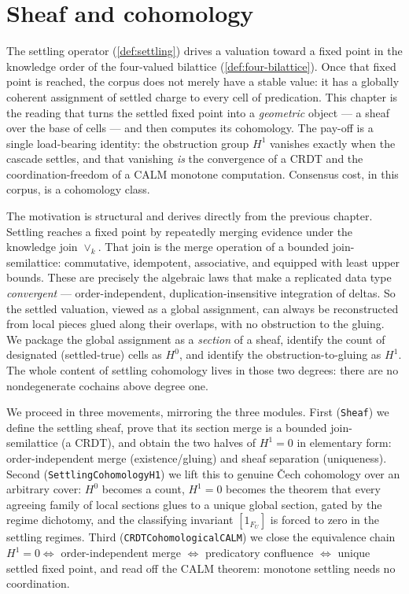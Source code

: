 \chapter{Sheaf and cohomology}\label{ch:sheaf}

The settling operator (\cref{def:settling}) drives a valuation toward a fixed point in the knowledge order of the four-valued bilattice (\cref{def:four-bilattice}). Once that fixed point is reached, the corpus does not merely have a stable value: it has a globally coherent assignment of settled charge to every cell of predication. This chapter is the reading that turns the settled fixed point into a \emph{geometric} object --- a sheaf over the base of cells --- and then computes its cohomology. The pay-off is a single load-bearing identity: the obstruction group $H^1$ vanishes exactly when the cascade settles, and that vanishing \emph{is} the convergence of a CRDT and the coordination-freedom of a CALM monotone computation. Consensus cost, in this corpus, is a cohomology class.

The motivation is structural and derives directly from the previous chapter. Settling reaches a fixed point by repeatedly merging evidence under the knowledge join $\vee_k$. That join is the merge operation of a bounded join-semilattice: commutative, idempotent, associative, and equipped with least upper bounds. These are precisely the algebraic laws that make a replicated data type \emph{convergent} --- order-independent, duplication-insensitive integration of deltas. So the settled valuation, viewed as a global assignment, can always be reconstructed from local pieces glued along their overlaps, with no obstruction to the gluing. We package the global assignment as a \emph{section} of a sheaf, identify the count of designated (settled-true) cells as $H^0$, and identify the obstruction-to-gluing as $H^1$. The whole content of settling cohomology lives in those two degrees: there are no nondegenerate cochains above degree one.

We proceed in three movements, mirroring the three modules. First (\texttt{Sheaf}) we define the settling sheaf, prove that its section merge is a bounded join-semilattice (a CRDT), and obtain the two halves of $H^1 = 0$ in elementary form: order-independent merge (existence/gluing) and sheaf separation (uniqueness). Second (\texttt{SettlingCohomologyH1}) we lift this to genuine \v{C}ech cohomology over an arbitrary cover: $H^0$ becomes a count, $H^1 = 0$ becomes the theorem that every agreeing family of local sections glues to a unique global section, gated by the regime dichotomy, and the classifying invariant $[1_{F_U}]$ is forced to zero in the settling regimes. Third (\texttt{CRDTCohomologicalCALM}) we close the equivalence chain $H^1 = 0 \iff$ order-independent merge $\iff$ predicatory confluence $\iff$ unique settled fixed point, and read off the CALM theorem: monotone settling needs no coordination.

